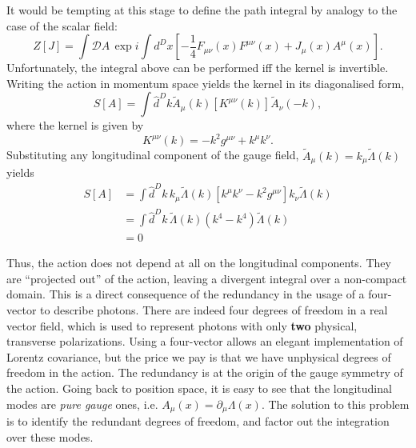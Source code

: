 \documentclass{article}
\numberwithin{equation}{section}
\begin{document}
It would be tempting at this stage to define the path integral by analogy to the case of the scalar field:
\begin{equation}
    Z[J] = \int \mathcal{D}A \, \exp{i \int d^Dx \left[-\frac{1}{4}F_{\mu\nu}(x)F^{\mu\nu}(x) + J_\mu(x) A^\mu(x)\right]}.
\end{equation}
Unfortunately, the integral above can be performed iff the kernel is invertible. Writing the action in momentum space yields the kernel in its diagonalised form,
\begin{equation}
    S[A] = \int \hat{d}^Dk \tilde{A}_\mu(k)[K^{\mu\nu}(k)]\tilde{A}_\nu(-k),
\end{equation}
where the kernel is given by 
\begin{equation}
    K^{\mu\nu}(k) = -k^2 g^{\mu\nu} + k^\mu k^\nu.
\end{equation}
Substituting any longitudinal component of the gauge field, $\tilde{A}_\mu(k) = k_\mu \tilde{\Lambda}(k)$ yields
\begin{equation}
\begin{aligned}
    S[A] &= \int \hat{d}^Dk \,k_\mu \tilde{\Lambda}(k)[k^\mu k^\nu - k^2 g^{\mu\nu}]k_\nu \tilde{\Lambda}(k) \\
    &= \int \hat{d}^Dk \, \tilde{\Lambda}(k) (k^4 - k^4)\tilde{\Lambda}(k) \\
    &= 0
\end{aligned}
\end{equation}

Thus, the action does not depend at all on the longitudinal components. They are ``projected out'' of the action, leaving a divergent integral over a non-compact domain. This is a direct consequence of the redundancy in the usage of a four-vector to describe photons. There are indeed four degrees of freedom in a real vector field, which is used to represent photons with only \textbf{two} physical, transverse polarizations. Using a four-vector allows an elegant implementation of Lorentz covariance, but the price we pay is that we have unphysical degrees of freedom in the action. The redundancy is at the origin of the gauge symmetry of the action. Going back to position space, it is easy to see that the longitudinal modes are \textit{pure gauge} ones, i.e. $A_\mu(x) = \partial_\mu \Lambda(x)$. The solution to this problem is to identify the redundant degrees of freedom, and factor out the integration over these modes.
\end{document}
